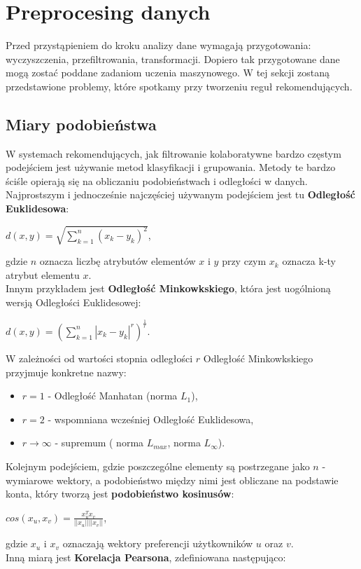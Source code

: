 \documentclass[12pt,a4paper]{report}
\begin{document}
\section{Preprocesing danych}
Przed przystąpieniem do kroku analizy dane wymagają przygotowania: wyczyszczenia, przefiltrowania, transformacji. Dopiero tak przygotowane dane mogą zostać poddane zadaniom uczenia maszynowego. W tej sekcji zostaną przedstawione problemy, które spotkamy przy tworzeniu reguł rekomendujących.
\subsection{Miary podobieństwa}
W systemach rekomendujących, jak filtrowanie kolaboratywne bardzo częstym podejściem jest używanie metod klasyfikacji i grupowania. Metody te bardzo ściśle opierają się na obliczaniu podobieństwach i odległości w danych.
\\Najprostszym i jednocześnie najczęściej używanym podejściem jest tu \textbf{Odległość Euklidesowa}:
\begin{center}
$d(x,y) = \sqrt{\sum_{k=1}^n (x_k-y_k)^2}$, 
\end{center}
gdzie $n$ oznacza liczbę atrybutów elementów $x$ i $y$ przy czym $x_k$ oznacza k-ty atrybut elementu $x$. 
\\Innym przykładem jest \textbf{Odległość Minkowkskiego}, która jest uogólnioną wersją Odległości Euklidesowej:
\begin{center}
$d(x,y) = (\sum_{k=1}^n|x_k-y_k|^r)^{\frac{1}{r}}$.
\end{center}
W zależności od wartości stopnia odległości $r$ Odległość Minkowkskiego przyjmuje konkretne nazwy:
\begin{itemize}
\item $r=1$ - Odległość Manhatan (norma $L_1$),
\item $r=2$ - wspomniana wcześniej Odległość Euklidesowa,
\item $r \longrightarrow \infty $ - supremum ( norma $L_{max}$, norma $L_{\infty}$). 
\end{itemize}
Kolejnym podejściem, gdzie poszczególne elementy są postrzegane jako $n$ - wymiarowe wektory, a podobieństwo między nimi jest obliczane na podstawie konta, który tworzą jest \textbf{podobieństwo kosinusów}:
\begin{center}
$cos(x_u, x_v) = \frac{x_u^{T}x_v}{||x_u|| ||x_v||}$,
\end{center}
gdzie $x_u$ i $x_v$ oznaczają wektory preferencji użytkowników $u$ oraz $v$.
\\Inną miarą jest \textbf{Korelacja Pearsona}, zdefiniowana następująco:
\end{document}
